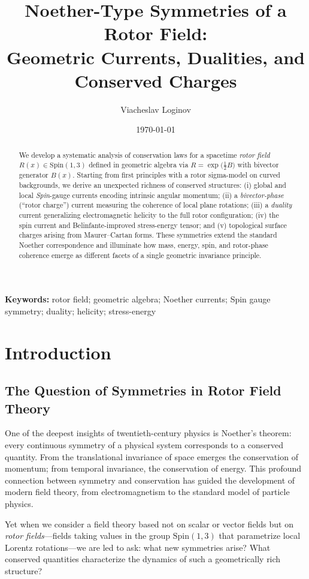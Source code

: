 \documentclass[11pt,a4paper]{article}
\title{Noether-Type Symmetries of a Rotor Field:\\
Geometric Currents, Dualities, and Conserved Charges}
\author[1]{Viacheslav Loginov}
\affil[1]{Kyiv, Ukraine\\ \texttt{barthez.slavik@gmail.com}}
\date{\today}
\numberwithin{equation}{section}
\theoremstyle{plain}
\theoremstyle{definition}
\theoremstyle{remark}
\newcommand{\keywords}{\textbf{Keywords:} rotor field; geometric algebra; Noether currents; Spin gauge symmetry; duality; helicity; stress-energy}
\begin{document}
\maketitle

\begin{abstract}
We develop a systematic analysis of conservation laws for a spacetime \emph{rotor field} $R(x)\in \mathrm{Spin}(1,3)$ defined in geometric algebra via $R=\exp\!\big(\tfrac{1}{2}B\big)$ with bivector generator $B(x)$. Starting from first principles with a rotor sigma-model on curved backgrounds, we derive an unexpected richness of conserved structures: (i) global and local \emph{Spin}-gauge currents encoding intrinsic angular momentum; (ii) a \emph{bivector-phase} (``rotor charge'') current measuring the coherence of local plane rotations; (iii) a \emph{duality} current generalizing electromagnetic helicity to the full rotor configuration; (iv) the spin current and Belinfante-improved stress-energy tensor; and (v) topological surface charges arising from Maurer--Cartan forms. These symmetries extend the standard Noether correspondence and illuminate how mass, energy, spin, and rotor-phase coherence emerge as different facets of a single geometric invariance principle.
\end{abstract}

\keywords

\section{Introduction}
\label{sec:intro}

\subsection{The Question of Symmetries in Rotor Field Theory}

One of the deepest insights of twentieth-century physics is Noether's theorem: every continuous symmetry of a physical system corresponds to a conserved quantity. From the translational invariance of space emerges the conservation of momentum; from temporal invariance, the conservation of energy. This profound connection between symmetry and conservation has guided the development of modern field theory, from electromagnetism to the standard model of particle physics.

Yet when we consider a field theory based not on scalar or vector fields but on \emph{rotor fields}---fields taking values in the group $\mathrm{Spin}(1,3)$ that parametrize local Lorentz rotations---we are led to ask: what new symmetries arise? What conserved quantities characterize the dynamics of such a geometrically rich structure?
\end{document}
